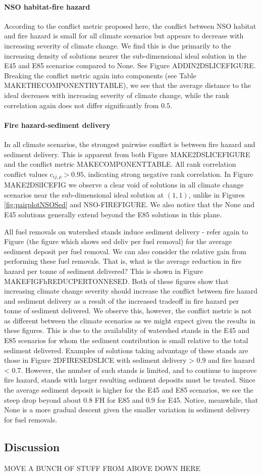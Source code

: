 \paragraph{NSO habitat-fire hazard}
According to the conflict metric proposed here, the conflict between NSO habitat and fire hazard is small for all climate scenarios but appears to decrease with increasing severity of climate change. We find this is due primarily to the increasing density of solutions nearer the sub-dimensional ideal solution in the E45 and E85 scenarios compared to None. See Figure ADDIN2DSLICEFIGURE. Breaking the conflict metric again into components (see Table MAKETHECOMPONENTRYTABLE), we see that the average distance to the ideal decreases with increasing severity of climate change, while the rank correlation again does not differ significantly from $0.5$.

\paragraph{Fire hazard-sediment delivery}
In all climate scenarios, the strongest pairwise conflict is between fire hazard and sediment delivery. This is apparent from both Figure MAKE2DSLICEFIGURE and the conflict metric MAKECOMPONENTTABLE. All rank correlation conflict values $c_{ij,\rho} > 0.95$, indicating strong negative rank correlation. In Figure MAKE2DSlICEFIG we observe a clear void of solutions in all climate change scenarios near the sub-dimensional ideal solution at $(1,1)$, unlike in Figures \ref{fig:pairplotNSOSed} and NSO-FIREFIGURE. We also notice that the None and E45 solutions generally extend beyond the E85 solutions in this plane.

All fuel removals on watershed stands induce sediment delivery - refer again to Figure (the figure which shows sed deliv per fuel removal) for the average sediment deposit per fuel removal. We can also consider the relative gain from performing these fuel removals. That is, what is the average reduction in fire hazard per tonne of sediment delivered? This is shown in Figure MAKEFIGFhREDUCPERTONNESED. Both of these figures show that increasing climate change severity should increase the conflict between fire hazard and sediment delivery as a result of the increased tradeoff in fire hazard per tonne of sediment delivered. We observe this, however, the conflict metric is not as different between the climate scenarios as we might expect given the results in these figures. This is due to the availability of watershed stands in the E45 and E85 scenarios for whom the sediment contribution is small relative to the total sediment delivered. Examples of solutions taking advantage of these stands are those in Figure 2DFIRESEDSLICE with sediment delivery > 0.9 and fire hazard < 0.7. However, the number of such stands is limited, and to continue to improve fire hazard, stands with larger resulting sediment deposits must be treated. Since the average sediment deposit is higher for the E45 and E85 scenarios, we see the steep drop beyond about 0.8 FH for E85 and 0.9 for E45. Notice, meanwhile, that None is a more gradual descent given the smaller variation in sediment delivery for fuel removals.

\subsection{Discussion}
MOVE A BUNCH OF STUFF FROM ABOVE DOWN HERE